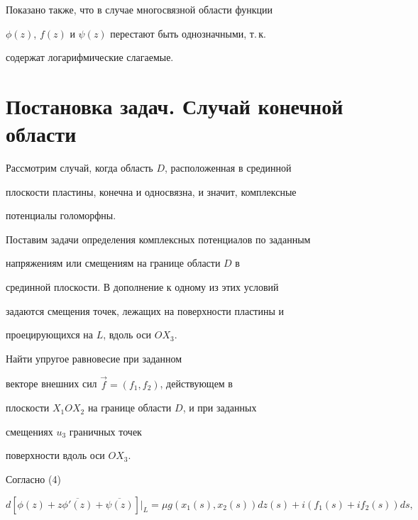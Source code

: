 Показано также, что в случае многосвязной области функции


$\phi(z)$, $f(z)$ и $\psi(z)$ перестают быть однозначными, т.\,к.


содержат логарифмические слагаемые.








\section{Постановка задач. Случай конечной области}





Рассмотрим случай, когда область $D$, расположенная в срединной


плоскости пластины, конечна и односвязна, и значит, комплексные


потенциалы голоморфны.





Поставим задачи определения комплексных потенциалов по заданным


напряжениям или смещениям на границе области $D$ в


срединной плоскости. В дополнение к одному из этих условий


задаются смещения точек, лежащих на поверхности пластины и


проецирующихся на $L$, вдоль оси $OX_3$.





\begin{prob}


Найти упругое равновесие при заданном


векторе внешних сил $\Vec{f} = (f_1,f_2)$, действующем в


плоскости $X_1OX_2$ на границе области $D$, и при заданных


смещениях $u_3$ граничных точек


поверхности вдоль оси $OX_3$.


\end{prob}





Согласно (4)


\begin{equation}


d[\phi(z) + z\overline{\phi'(z)} + \overline{\psi(z)}]\vert_{L} =


\mu g(x_1(s),x_2(s)) dz(s) + i(f_1(s) + i f_2(s)) ds,


\end{equation}


